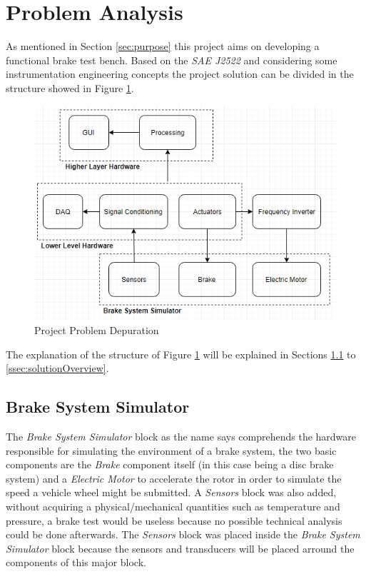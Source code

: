 \section{Problem Analysis}

	As mentioned in Section \ref{sec:purpose} this project aims on developing a functional brake test bench. Based on the \textit{SAE J2522} \cite{sae} and considering some instrumentation engineering concepts the project solution can be divided in the structure showed in Figure \ref{fig:projectProblem}.
	
	\begin{figure}[htbp]
		\centering
			\includegraphics[scale=0.9]{figuras/fig-projectProblem}
		\caption{Project Problem Depuration \cite{projectProblem}}
		\label{fig:projectProblem}
	\end{figure}
	
	The explanation of the structure of Figure \ref{fig:projectProblem} will be explained in Sections \ref{ssec:brakeSystemSimulator} to  \ref{ssec:solutionOverview}.

	\subsection{Brake System Simulator}\label{ssec:brakeSystemSimulator}
		
		The \textit{Brake System Simulator} block as the name says comprehends the hardware responsible for simulating the environment of a brake system, the two basic components are the \textit{Brake} component itself (in this case being a disc brake system) and a \textit{Electric Motor} to accelerate the rotor in order to simulate the speed a vehicle wheel might be submitted. A \textit{Sensors} block was also added, without acquiring a physical/mechanical quantities such as temperature and pressure, a brake test would be useless because no possible technical analysis could be done afterwards. The \textit{Sensors} block was placed inside the \textit{Brake System Simulator} block because the sensors and transducers will be placed arround the components of this major block.

